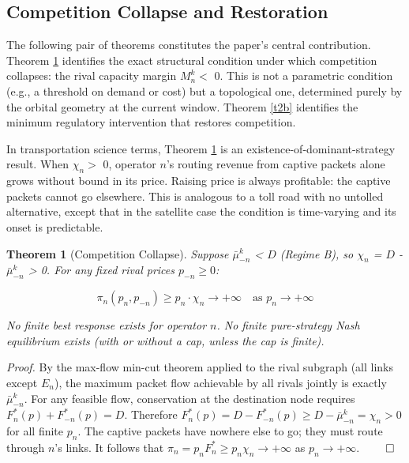 \documentclass[review,3p,authoryear]{elsarticle}
\newtheorem{theorem}{Theorem}[section]
\begin{document}
\subsection{Competition Collapse and Restoration}

The following pair of theorems constitutes the paper's central contribution. Theorem \ref{t2a} identifies the exact structural condition under which competition collapses: the rival capacity margin $M_{n}^{k} <$ 0. This is not a parametric condition (e.g., a threshold on demand or cost) but a topological one, determined purely by the orbital geometry at the current window. Theorem \ref{t2b} identifies the minimum regulatory intervention that restores competition.

In transportation science terms, Theorem \ref{t2a} is an existence-of-dominant-strategy result. When ${\chi}_{n} >$ 0, operator $n$'s routing revenue from captive packets alone grows without bound in its price. Raising price is always profitable: the captive packets cannot go elsewhere. This is analogous to a toll road with no untolled alternative, except that in the satellite case the condition is time-varying and its onset is predictable.

\begin{theorem}[Competition Collapse]\label{t2a}
Suppose $\ensuremath{\bar{{\mu}}}_{-n}^{k}$ < $D$ (Regime B), so ${\chi}_{n}$ = $D$ - $\ensuremath{\bar{{\mu}}}_{-n}^{k}$ > 0. For any fixed rival prices $p_{-n} {\ge} 0$:

\begin{equation}
{\pi}_{n}(p_n, p_{-n}) \ge p_n {\cdot} {\chi}_n \to +\infty \quad\text{as } p_n \to +\infty
\end{equation}

No finite best response exists for operator $n$. No finite pure-strategy Nash equilibrium exists (with or without a cap, unless the cap is finite).
\end{theorem}

\medskip\noindent\textit{Proof.} By the max-flow min-cut theorem applied to the rival subgraph (all links except $E_{n}$), the maximum packet flow achievable by all rivals jointly is exactly $\ensuremath{\bar{{\mu}}}_{-n}^{k}$. For any feasible flow, conservation at the destination node requires $F_{n}^{*}(p) + F_{-n}^{*}(p) = D$. Therefore $F_{n}^{*}(p) = D - F_{-n}^{*}(p) {\ge} D - \ensuremath{\bar{{\mu}}}_{-n}^{k} = {\chi}_{n} > 0$ for all finite $p_{n}$. The captive packets have nowhere else to go; they must route through $n$'s links. It follows that ${\pi}_{n} = p_{n} F_{n}^{*} \ge p_{n} {\chi}_{n} \to +\infty$ as $p_{n} \to +\infty$. $\qed$
\end{document}
